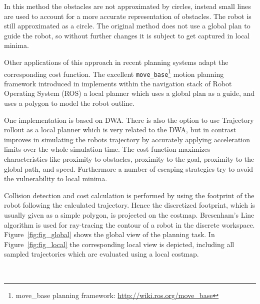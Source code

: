 In this method the obstacles are not approximated by circles, instead small lines are used to account for a more accurate representation of obstacles.
The robot is still approximated as a circle.
The original method does not use a global plan to guide the robot, so without further changes it is subject to get captured in local minima.

Other applications of this approach in recent planning systems adapt the corresponding cost function.
The excellent \texttt{move\_base}\footnote{move\_base planning framework: \url{http://wiki.ros.org/move_base}} motion planning framework introduced in \cite{DBLP:conf/icra/Marder-EppsteinBFGK10} implements within the navigation stack of Robot Operating System (ROS) a local planner which uses a global plan as a guide, and uses a polygon to model the robot outline.

One implementation is based on DWA.
There is also the option to use Trajectory rollout \cite{gerkey08planning} as a local planner which is very related to the DWA, but in contrast improves in simulating the robots trajectory by accurately applying acceleration limits over the whole simulation time.
The cost function maximizes characteristics like proximity to obstacles, proximity to the goal, proximity to the global path, and speed.
Furthermore a number of escaping strategies try to avoid the vulnerability to local minima. 

Collision detection and cost calculation is performed by using the footprint of the robot following the calculated trajectory.
Hence the discretized footprint, which is usually given as a simple polygon, is projected on the costmap. 
Bresenham's Line algorithm \cite{bresenham1965algorithm} is used for ray-tracing the contour of a robot in the discrete workspace. 
Figure~\ref{fig:fig_global} shows the global view of the planning task. 
In Figure~\ref{fig:fig_local} the corresponding local view is depicted, including all sampled trajectories which are evaluated using a local costmap.

\begin{figure}[thpb]
	  \myfloatalign
      \footnotesize
      \centering
     \\    
   \caption[]{}
   \label{fig:fig_dwa}
\end{figure}


